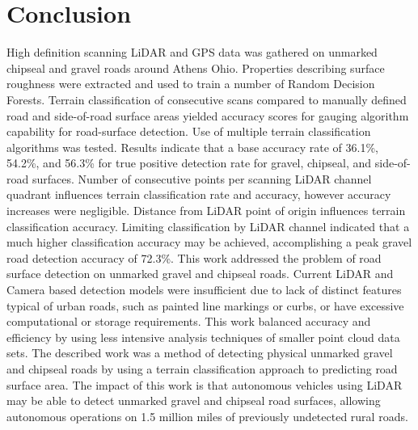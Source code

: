 \documentclass[journal,onecolumn]{IEEEtran}
\begin{document}
	

		

\section{Conclusion}
	
	{High definition scanning LiDAR and GPS data was gathered on unmarked chipseal and gravel roads around Athens Ohio. Properties describing surface roughness were extracted and used to train a number of Random Decision Forests. Terrain classification of consecutive scans compared to manually defined road and side-of-road surface areas yielded accuracy scores for gauging algorithm capability for road-surface detection. Use of multiple terrain classification algorithms was tested. Results indicate that a base accuracy rate of 36.1\%, 54.2\%, and 56.3\% for true positive detection rate for gravel, chipseal, and side-of-road surfaces. Number of consecutive points per scanning LiDAR channel quadrant influences terrain classification rate and accuracy, however accuracy increases were negligible. Distance from LiDAR point of origin influences terrain classification accuracy. Limiting classification by LiDAR channel indicated that a much higher classification accuracy may be achieved, accomplishing a peak gravel road detection accuracy of 72.3\%. This work addressed the problem of road surface detection on unmarked gravel and chipseal roads. Current LiDAR and Camera based detection models were insufficient due to lack of distinct features typical of urban roads, such as painted line markings or curbs, or have excessive computational or storage requirements. This work balanced accuracy and efficiency by using less intensive analysis techniques of smaller point cloud data sets. The described work was a method of detecting physical unmarked gravel and chipseal roads by using a terrain classification approach to predicting road surface area. The impact of this work is that autonomous vehicles using LiDAR may be able to detect unmarked gravel and chipseal road surfaces, allowing autonomous operations on 1.5 million miles of previously undetected rural roads.} 
%
\IEEEpeerreviewmaketitle
\end{document}
